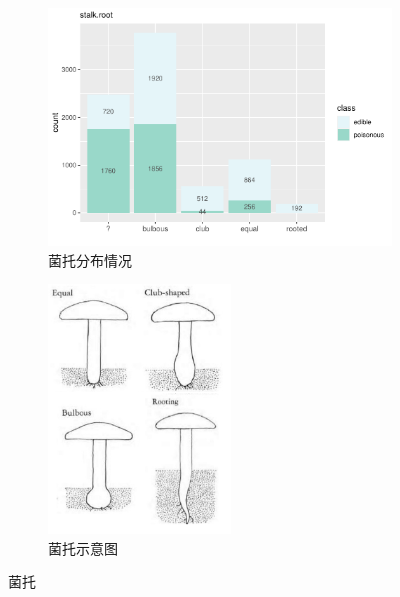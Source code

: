 \documentclass[lang=cn,11pt,a4paper,cite=super]{elegantpaper}
\begin{document}
\begin{enumerate}
   \begin{figure}[hbt]
      \begin{subfigure}[b]{0.59\textwidth}
        \centering
        \includegraphics[width=\linewidth]{img/stalkroot-1.pdf}  
      \caption{菌托分布情况}
      \end{subfigure}
      \begin{subfigure}[b]{0.39\textwidth}
        \centering
        \includegraphics[width=0.8\linewidth,height=2.6in]{img/stalkroot.PNG}  
        \caption{菌托示意图}
        \label{fig:jtsyt}
      \end{subfigure}
      \caption{菌托}
      \label{fig:stalkroot}
   \end{figure}


\end{enumerate}
\end{document}

